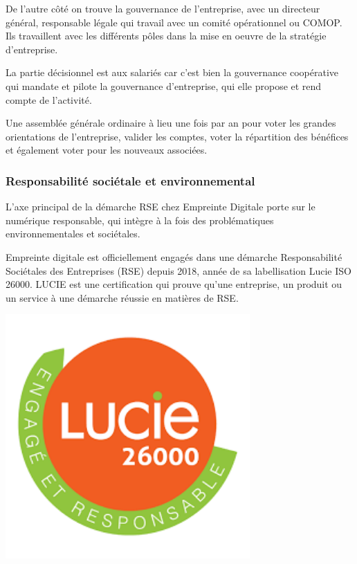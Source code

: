 \documentclass[12pt]{article}
\begin{document}
De l'autre côté on trouve la gouvernance de l'entreprise, avec un directeur général, responsable légale qui travail avec un comité opérationnel ou COMOP. 
Ils travaillent avec les différents pôles dans la mise en oeuvre de la stratégie d'entreprise.

La partie décisionnel est aux salariés car c'est bien la gouvernance coopérative qui mandate et pilote la gouvernance d'entreprise, qui elle propose et rend compte de l'activité.

Une assemblée générale ordinaire à lieu une fois par an pour voter les grandes orientations de l'entreprise, valider les comptes, voter la répartition des bénéfices et également voter pour les nouveaux associées.

\subsubsection{Responsabilité sociétale et environnemental}
L'axe principal de la démarche RSE chez Empreinte Digitale porte sur le numérique responsable, qui intègre à la fois des problématiques environnementales et sociétales.

\noindent%
\begin{minipage}{.7\textwidth}%
Empreinte digitale est officiellement engagés dans une démarche  Responsabilité Sociétales des Entreprises (RSE) depuis 2018, année de sa labellisation Lucie ISO 26000. 
LUCIE est une certification qui prouve qu'une entreprise, un produit ou un service à une démarche réussie en matières de RSE.

\end{minipage}%
\hfill
\begin{minipage}{.3\textwidth}%
\begin{center}
\includegraphics[width=0.7\textwidth]{src/lucie.png}
\end{center}
\end{minipage}%
\end{document}
